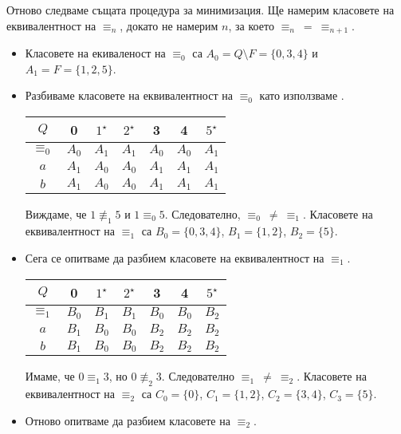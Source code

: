 \begin{example}
  
  Отново следваме същата процедура за минимизация.
  Ще намерим класовете на еквивалентност на $\equiv_n$,
  докато не намерим $n$, за което $\equiv_n\ =\ \equiv_{n+1}$.
  \begin{itemize}
  \item
    Класовете на екиваленост на $\equiv_0$ са 
    $A_0 = Q\setminus F = \{0,3,4\}$ и $A_1 = F = \{1,2,5\}$.
  \item
    Разбиваме класовете на еквивалентност на $\equiv_0$ като използваме .
    
    \begin{tabular}{|c|c|c|c|c|c|c|}
      \hline
      $Q$ & 0 & $1^\star$ & $2^\star$ & 3 & 4 & $5^\star$ \\
      \hline
      \hline
      $\equiv_0$ & $A_0$ & $A_1$ & $A_1$ & $A_0$ & $A_0$ & $A_1$\\
      \hline
      $a$ & $A_1$& $A_0$ & $A_0$ & $A_1$ & $A_1$ & $A_1$\\
      \hline
      $b$ & $A_1$& $A_0$ & $A_0$ & $A_1$ & $A_1$ & $A_1$\\
      \hline
    \end{tabular}
    
    Виждаме, че $1 \not\equiv_1 5$ и $1 \equiv_0 5$.
    Следователно, $\equiv_0\ \neq\ \equiv_1$.
    Класовете на еквивалентност на $\equiv_1$ са 
    $B_0 = \{0,3,4\}$, $B_1 = \{1,2\}$, $B_2 = \{5\}$.
  \item
    Сега се опитваме да разбием класовете на еквивалентност на $\equiv_1$.

    \begin{tabular}{|c|c|c|c|c|c|c|}
      \hline
      $Q$ & 0 & $1^\star$ & $2^\star$ & 3 & 4 & $5^\star$ \\
      \hline
      \hline
      $\equiv_1$ & $B_0$ & $B_1$ & $B_1$ & $B_0$ & $B_0$ & $B_2$\\
      \hline
      $a$ & $B_1$ & $B_0$ & $B_0$ & $B_2$ & $B_2$ & $B_2$\\
      \hline
      $b$ & $B_1$ & $B_0$ & $B_0$ & $B_2$ & $B_2$ & $B_2$\\
      \hline
    \end{tabular}
    
    Имаме, че $0 \equiv_1 3$, но $0 \not\equiv_2 3$. Следователно $\equiv_1\ \neq\ \equiv_2$.
    Класовете на еквивалентност на $\equiv_2$ са 
    $C_0 = \{0\}$, $C_1 = \{1,2\}$, $C_2 = \{3,4\}$, $C_3 = \{5\}$.
  \item
    Отново опитваме да разбием класовете на $\equiv_2$.


\end{itemize}
\end{example}
